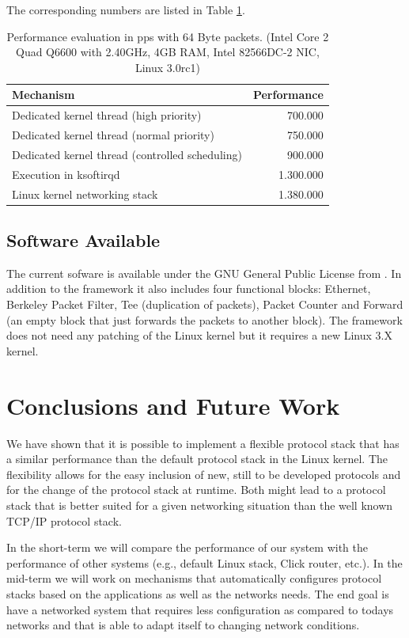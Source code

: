 \documentclass{sig-alternate}
\begin{document}
The corresponding numbers are listed in Table \ref{tab:performance}.
\begin{table}[htb]
\begin{tabular}{ l r }
Mechanism & Performance\\
\hline
Dedicated kernel thread (high priority) & 700.000\\
Dedicated kernel thread (normal priority) & 750.000\\
Dedicated kernel thread (controlled scheduling) & 900.000\\
Execution in ksoftirqd & 1.300.000\\
Linux kernel networking stack & 1.380.000\\
\end{tabular}
\caption{Performance evaluation in pps with 64 Byte packets.
(Intel Core 2 Quad Q6600 with 2.40GHz, 4GB RAM, Intel 82566DC-2 NIC, Linux 3.0rc1)}
\label{tab:performance}
\end{table}

\subsection{Software Available}
The current sofware is available under the GNU General Public License from 
\cite{lana}. In addition to the framework it also includes four functional 
blocks: Ethernet, Berkeley Packet Filter, Tee (duplication of packets), Packet 
Counter and Forward (an empty block that just forwards the packets to 
another block). The framework does not need any patching of the Linux kernel
but it requires a new Linux 3.X kernel.

\section{Conclusions and Future Work}
We have shown that it is possible to implement a flexible protocol stack that has a similar performance than the default protocol stack in the Linux kernel. The flexibility allows for the easy inclusion of new, still to be developed protocols and for the change of the protocol stack at runtime. Both might lead to a protocol stack that is better suited for a given networking situation than the well known TCP/IP protocol stack.

In the short-term we will compare the performance of our system with the performance of other systems (e.g., default Linux stack, Click router, etc.). 
In the mid-term we will work on mechanisms that automatically configures protocol stacks based on the applications as well as the networks needs. 
The end goal is have a networked system that requires less configuration as compared to todays networks and that is able to adapt itself to changing network conditions.   
\end{document}
